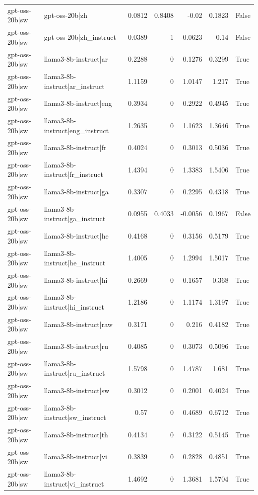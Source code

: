 \begin{table}
\begin{tabular}{l l r r r r l}
gpt-oss-20b|sw & gpt-oss-20b|zh & 0.0812 & 0.8408 & -0.02 & 0.1823 & False \\
gpt-oss-20b|sw & gpt-oss-20b|zh_instruct & 0.0389 & 1 & -0.0623 & 0.14 & False \\
gpt-oss-20b|sw & llama3-8b-instruct|ar & 0.2288 & 0 & 0.1276 & 0.3299 & True \\
gpt-oss-20b|sw & llama3-8b-instruct|ar_instruct & 1.1159 & 0 & 1.0147 & 1.217 & True \\
gpt-oss-20b|sw & llama3-8b-instruct|eng & 0.3934 & 0 & 0.2922 & 0.4945 & True \\
gpt-oss-20b|sw & llama3-8b-instruct|eng_instruct & 1.2635 & 0 & 1.1623 & 1.3646 & True \\
gpt-oss-20b|sw & llama3-8b-instruct|fr & 0.4024 & 0 & 0.3013 & 0.5036 & True \\
gpt-oss-20b|sw & llama3-8b-instruct|fr_instruct & 1.4394 & 0 & 1.3383 & 1.5406 & True \\
gpt-oss-20b|sw & llama3-8b-instruct|ga & 0.3307 & 0 & 0.2295 & 0.4318 & True \\
gpt-oss-20b|sw & llama3-8b-instruct|ga_instruct & 0.0955 & 0.4033 & -0.0056 & 0.1967 & False \\
gpt-oss-20b|sw & llama3-8b-instruct|he & 0.4168 & 0 & 0.3156 & 0.5179 & True \\
gpt-oss-20b|sw & llama3-8b-instruct|he_instruct & 1.4005 & 0 & 1.2994 & 1.5017 & True \\
gpt-oss-20b|sw & llama3-8b-instruct|hi & 0.2669 & 0 & 0.1657 & 0.368 & True \\
gpt-oss-20b|sw & llama3-8b-instruct|hi_instruct & 1.2186 & 0 & 1.1174 & 1.3197 & True \\
gpt-oss-20b|sw & llama3-8b-instruct|raw & 0.3171 & 0 & 0.216 & 0.4182 & True \\
gpt-oss-20b|sw & llama3-8b-instruct|ru & 0.4085 & 0 & 0.3073 & 0.5096 & True \\
gpt-oss-20b|sw & llama3-8b-instruct|ru_instruct & 1.5798 & 0 & 1.4787 & 1.681 & True \\
gpt-oss-20b|sw & llama3-8b-instruct|sw & 0.3012 & 0 & 0.2001 & 0.4024 & True \\
gpt-oss-20b|sw & llama3-8b-instruct|sw_instruct & 0.57 & 0 & 0.4689 & 0.6712 & True \\
gpt-oss-20b|sw & llama3-8b-instruct|th & 0.4134 & 0 & 0.3122 & 0.5145 & True \\
gpt-oss-20b|sw & llama3-8b-instruct|vi & 0.3839 & 0 & 0.2828 & 0.4851 & True \\
gpt-oss-20b|sw & llama3-8b-instruct|vi_instruct & 1.4692 & 0 & 1.3681 & 1.5704 & True \\

\end{tabular}
\end{table}
